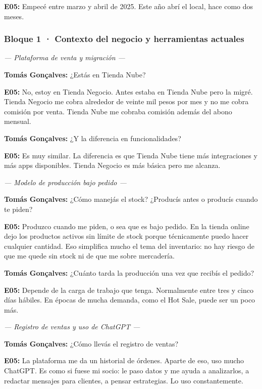 \noindent\textbf{E05:} Empecé entre marzo y abril de 2025. Este año abrí el local, hace como dos meses.

\subsubsection*{Bloque 1 · Contexto del negocio y herramientas actuales}

\noindent\textit{--- Plataforma de venta y migración ---}

\noindent\textbf{Tomás Gonçalves:} ¿Estás en Tienda Nube?

\noindent\textbf{E05:} No, estoy en Tienda Negocio. Antes estaba en Tienda Nube pero la migré. Tienda Negocio me cobra alrededor de veinte mil pesos por mes y no me cobra comisión por venta. Tienda Nube me cobraba comisión además del abono mensual.

\noindent\textbf{Tomás Gonçalves:} ¿Y la diferencia en funcionalidades?

\noindent\textbf{E05:} Es muy similar. La diferencia es que Tienda Nube tiene más integraciones y más apps disponibles. Tienda Negocio es más básica pero me alcanza.

\noindent\textit{--- Modelo de producción bajo pedido ---}

\noindent\textbf{Tomás Gonçalves:} ¿Cómo manejás el stock? ¿Producís antes o producís cuando te piden?

\noindent\textbf{E05:} Produzco cuando me piden, o sea que es bajo pedido. En la tienda online dejo los productos activos sin límite de stock porque técnicamente puedo hacer cualquier cantidad. Eso simplifica mucho el tema del inventario: no hay riesgo de que me quede sin stock ni de que me sobre mercadería.

\noindent\textbf{Tomás Gonçalves:} ¿Cuánto tarda la producción una vez que recibís el pedido?

\noindent\textbf{E05:} Depende de la carga de trabajo que tenga. Normalmente entre tres y cinco días hábiles. En épocas de mucha demanda, como el Hot Sale, puede ser un poco más.

\noindent\textit{--- Registro de ventas y uso de ChatGPT ---}

\noindent\textbf{Tomás Gonçalves:} ¿Cómo llevás el registro de ventas?

\noindent\textbf{E05:} La plataforma me da un historial de órdenes. Aparte de eso, uso mucho ChatGPT. Es como si fuese mi socio: le paso datos y me ayuda a analizarlos, a redactar mensajes para clientes, a pensar estrategias. Lo uso constantemente.


